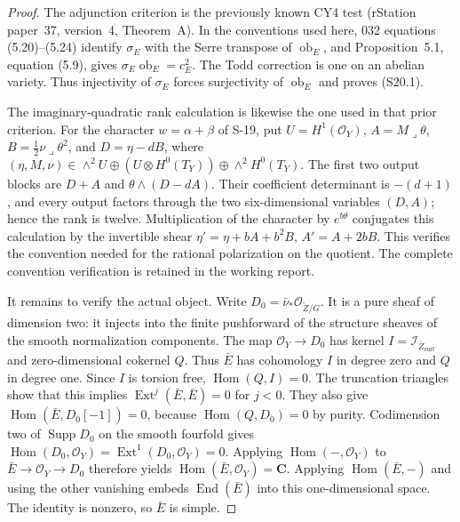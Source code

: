 \documentclass[11pt,a4paper]{article}
\theoremstyle{definition}
\begin{document}
\begin{proof}
The adjunction criterion is the previously known CY4 test
(rStation paper~37, version~4, Theorem~A). In the conventions
used here, 032 equations (5.20)--(5.24) identify $\sigma_E$
with the Serre transpose of $\operatorname{ob}_E$, and
Proposition~5.1, equation (5.9), gives
$\sigma_E\operatorname{ob}_E=c_E^2$. The Todd correction is
one on an abelian variety. Thus injectivity of $\sigma_E$
forces surjectivity of $\operatorname{ob}_E$ and proves
(S20.1).

The imaginary-quadratic rank calculation is likewise the
one used in that prior criterion. For the character
$w=\alpha+\beta$ of S-19, put $U=H^1(\mathcal O_Y)$,
$A=M\mathbin{\lrcorner}\theta$,
$B=\tfrac12\nu\mathbin{\lrcorner}\theta^2$, and
$D=\eta-dB$, where
$(\eta,M,\nu)\in\wedge^2U\oplus(U\otimes H^0(T_Y))
\oplus\wedge^2H^0(T_Y)$.
The first two output blocks are
$D+A$ and $\theta\wedge(D-dA)$.
Their coefficient determinant is $-(d+1)$, and every output
factors through the two six-dimensional variables $(D,A)$;
hence the rank is twelve. Multiplication of the character
by $e^{b\theta}$ conjugates this calculation by the invertible
shear $\eta'=\eta+bA+b^2B$, $A'=A+2bB$.
This verifies the convention needed for the rational
polarization on the quotient. The complete convention
verification is retained in the working report.

It remains to verify the actual object. Write
$D_0=\bar\nu_*\mathcal O_{\widetilde Z/G}$.
It is a pure sheaf of dimension two: it injects into the
finite pushforward of the structure sheaves of the smooth
normalization components. The map $\mathcal O_Y\to D_0$
has kernel $I=\mathcal I_{\bar Z_{\mathrm{surf}}}$ and
zero-dimensional cokernel $Q$. Thus $\bar E$ has cohomology
$I$ in degree zero and $Q$ in degree one.
Since $I$ is torsion free,
$\operatorname{Hom}(Q,I)=0$. The truncation triangles show
that this implies
$\operatorname{Ext}^{j}(\bar E,\bar E)=0$ for $j<0$.
They also give
$\operatorname{Hom}(\bar E,D_0[-1])=0$, because
$\operatorname{Hom}(Q,D_0)=0$ by purity.
Codimension two of $\operatorname{Supp}D_0$ on the smooth
fourfold gives
$\operatorname{Hom}(D_0,\mathcal O_Y)
=\operatorname{Ext}^1(D_0,\mathcal O_Y)=0$.
Applying $\operatorname{Hom}(-,\mathcal O_Y)$ to
$\bar E\to\mathcal O_Y\to D_0$ therefore yields
$\operatorname{Hom}(\bar E,\mathcal O_Y)=\mathbf C$.
Applying $\operatorname{Hom}(\bar E,-)$ and using the other
vanishing embeds $\operatorname{End}(\bar E)$ into this
one-dimensional space. The identity is nonzero, so
$\bar E$ is simple.


\end{proof}
\end{document}
